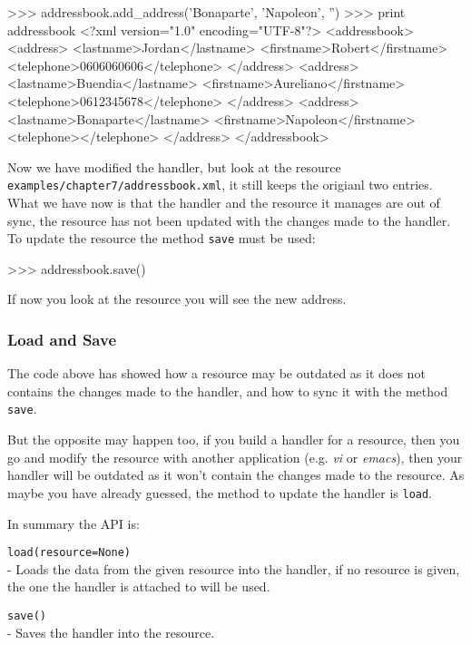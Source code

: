 \begin{code}
    >>> addressbook.add_address('Bonaparte', 'Napoleon', '')
    >>> print addressbook
    <?xml version="1.0" encoding="UTF-8"?>
    <addressbook>
      <address>
        <lastname>Jordan</lastname>
        <firstname>Robert</firstname>
        <telephone>0606060606</telephone>
      </address>
      <address>
        <lastname>Buendia</lastname>
        <firstname>Aureliano</firstname>
        <telephone>0612345678</telephone>
     </address>
     <address>
       <lastname>Bonaparte</lastname>
       <firstname>Napoleon</firstname>
       <telephone></telephone>
     </address>
   </addressbook>
\end{code}

Now we have modified the handler, but look at the resource
{\tt examples/chapter7/addressbook.xml}, it still keeps the origianl two
entries. What we have now is that the handler and the resource it manages
are out of sync, the resource has not been updated with the changes made
to the handler. To update the resource the method {\tt save} must be used:

\begin{code}
    >>> addressbook.save()
\end{code}

If now you look at the resource you will see the new address.


\subsubsection{Load and Save}

The code above has showed how a resource may be outdated as it does not
contains the changes made to the handler, and how to sync it with the
method {\tt save}.

But the opposite may happen too, if you build a handler for a resource,
then you go and modify the resource with another application (e.g. {\em vi}
or {\em emacs}), then your handler will be outdated as it won't contain the
changes made to the resource. As maybe you have already guessed, the method
to update the handler is {\tt load}.

In summary the API is:

\begin{api}
  {\tt load(resource=None)}\\
  - Loads the data from the given resource into the handler, if no
    resource is given, the one the handler is attached to will be used.

  {\tt save()}\\
  - Saves the handler into the resource.
\end{api}


\subsubsection{}
